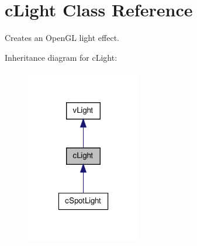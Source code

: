 \hypertarget{classc_light}{
\section{cLight Class Reference}
\label{classc_light}
}


Creates an OpenGL light effect.  




Inheritance diagram for cLight:
\nopagebreak
\begin{figure}[H]
\begin{center}
\leavevmode
\includegraphics[width=142pt]{classc_light__inherit__graph}
\end{center}
\end{figure}


